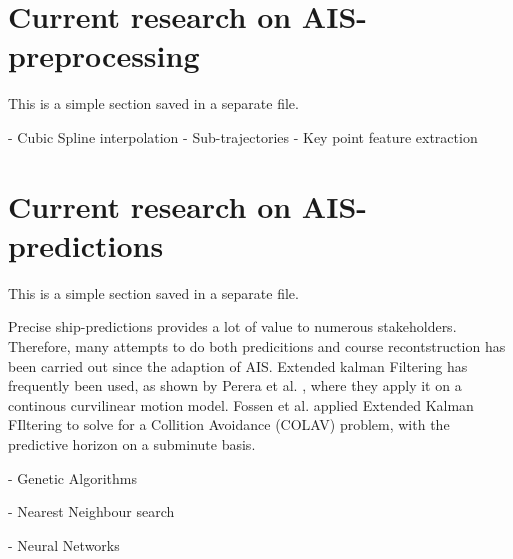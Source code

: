 \section{Current research on AIS-preprocessing}
\begin{info}{}
	This is a simple section saved in a separate file.
\end{info}
- Cubic Spline interpolation
- Sub-trajectories
- Key point feature extraction





\section{Current research on AIS-predictions}
\begin{info}{}
	This is a simple section saved in a separate file.
\end{info}
Precise ship-predictions provides a lot of value to numerous stakeholders. Therefore, many attempts to do both predicitions and course recontstruction has been carried out since the adaption of AIS. Extended kalman Filtering has frequently been used, as shown by Perera et al. \cite{Perera2010}, where they apply it on a continous curvilinear motion model. Fossen et al. \cite{Fossen2018} applied Extended Kalman FIltering to solve for a Collition Avoidance (COLAV) problem, with the predictive horizon on a subminute basis. 



- Genetic Algorithms

- Nearest Neighbour search

- Neural Networks







